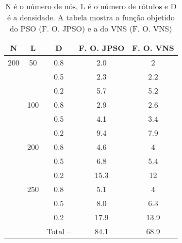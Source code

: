\documentclass{sig-alternate-05-2015}
\begin{document}
\begin{table}


\begin{tabular}{ccccc}
        \hline \rule[-2ex]{0pt}{5.5ex} N & L & D  & F. O. JPSO & F. O. VNS \\ 
        \hline \rule[-2ex]{0pt}{5.5ex} 200 & 50 & 0.8 & 2.0 & 2\\ 
        \rule[-2ex]{0pt}{5.5ex}  &  & 0.5 & 2.3 & 2.2\\ 
         \rule[-2ex]{0pt}{5.5ex}  &  & 0.2 & 5.7 &5.2\\ 
         \rule[-2ex]{0pt}{5.5ex}  & 100 & 0.8 & 2.9 &2.6 \\ 
         \rule[-2ex]{0pt}{5.5ex}  &  & 0.5 & 4.1 &3.4\\ 
         \rule[-2ex]{0pt}{5.5ex}  &  & 0.2 & 9.4 & 7.9\\ 
         \rule[-2ex]{0pt}{5.5ex}  & 200 & 0.8 & 4.6 & 4\\ 
         \rule[-2ex]{0pt}{5.5ex}  &  & 0.5 & 6.8 & 5.4\\ 
         \rule[-2ex]{0pt}{5.5ex}  &  & 0.2 & 15.3 & 12\\ 
         \rule[-2ex]{0pt}{5.5ex}  & 250 & 0.8 & 5.1 & 4\\ 
         \rule[-2ex]{0pt}{5.5ex}  &  & 0.5 & 8.0 & 6.3\\ 
         \rule[-2ex]{0pt}{5.5ex}  &  & 0.2 & 17.9 & 13.9\\ 
        \hline \rule[-2ex]{0pt}{5.5ex}  &  & Total --  & 84.1 & 68.9\\ 
        \hline 
\end{tabular} 
\caption{N é o número de nós, L é o número de rótulos e D é a densidade.  A tabela mostra a função objetido do PSO (F. O. JPSO) e a do VNS (F. O. VNS)}
\label{tab5}
\end{table}
\end{document}
